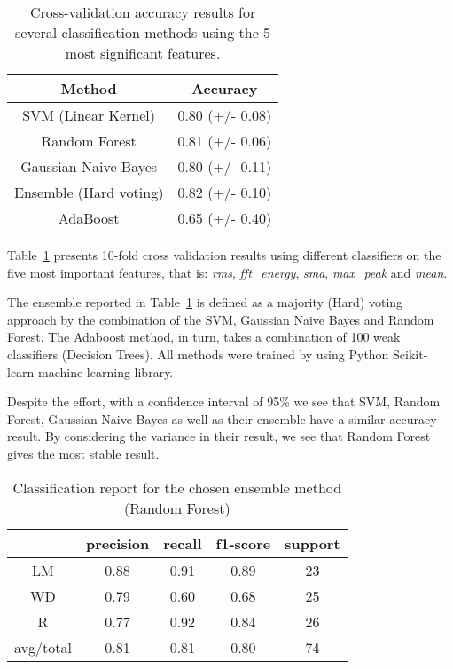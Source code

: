 \begin{table}[h]\footnotesize
  \centering
  \caption{Cross-validation accuracy results for several classification methods using the 5 most significant features.%
  }
  \begin{tabular}{| c | c |}
    \hline
  	   \textbf{Method}          & \textbf{Accuracy}\\\hline
       SVM (Linear Kernel)      & 0.80 (+/- 0.08)  \\\hline
       Random Forest            & 0.81 (+/- 0.06)  \\\hline
       Gaussian Naive Bayes     & 0.80 (+/- 0.11)  \\\hline
       Ensemble (Hard voting)   & 0.82 (+/- 0.10)  \\\hline
       AdaBoost                 & 0.65 (+/- 0.40)   \\\hline
  \end{tabular}
  \label{accuracy5best}
\end{table}


Table~\ref{accuracy5best} presents 10-fold cross validation results using different classifiers on the five most important features, that is: \textit{rms}, \textit{fft\_energy}, \textit{sma}, \textit{max\_peak} and \textit{mean}. 

The ensemble reported in Table~\ref{accuracy5best} is defined as a majority (Hard) voting approach by the combination of the SVM, Gaussian Naive Bayes and Random Forest. The Adaboost method, in turn, takes a combination of 100 weak classifiers (Decision Trees). All methods were trained by using Python Scikit-learn machine learning library.

Despite the effort, with a confidence interval of 95\% we see that SVM, Random Forest, Gaussian Naive Bayes as well as their ensemble have a similar accuracy result. By considering the variance in their result, we see that Random Forest gives the most stable result. 

\begin{table}[h]\footnotesize
  \centering
  \caption{Classification report for the chosen ensemble method (Random Forest) %
  }
  \begin{tabular}{| c | c | c | c | c |}
    \hline
  	   & precision   & recall & f1-score &  support \\\hline
    LM &      0.88   &  0.91  &    0.89  &      23  \\\hline
    WD &      0.79   &  0.60 &     0.68 &       25  \\\hline
     R &      0.77   &  0.92 &     0.84 &       26  \\\hline
avg/total &   0.81   &  0.81 &     0.80 &       74  \\\hline
  \end{tabular}
  \label{report}
\end{table}

